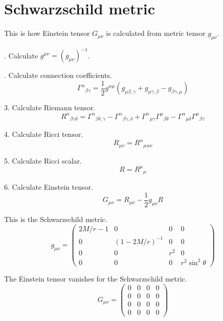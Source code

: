 \documentclass[12pt]{article}
\begin{document}
\section*{Schwarzschild metric}

This is how Einstein tensor $G_{\mu\nu}$ is calculated from metric tensor $g_{\mu\nu}$.

. Calculate $g^{\mu\nu}=(g_{\mu\nu})^{-1}$.

. Calculate connection coefficients.
\begin{equation*}
\Gamma^\alpha{}_{\beta\gamma}=\frac{1}{2}
g^{\alpha\mu}(g_{\mu\beta,\gamma}+g_{\mu\gamma,\beta}-g_{\beta\gamma,\mu})
\end{equation*}

3. Calculate Riemann tensor.
\begin{equation*}
R^\alpha{}_{\beta\gamma\delta}
=\Gamma^\alpha{}_{\beta\delta,\gamma}
-\Gamma^\alpha{}_{\beta\gamma,\delta}
+\Gamma^\alpha{}_{\mu\gamma}\Gamma^\mu{}_{\beta\delta}
-\Gamma^\alpha{}_{\mu\delta}\Gamma^\mu{}_{\beta\gamma}
\end{equation*}

4. Calculate Ricci tensor.
\begin{equation*}
R_{\mu\nu}=R^\alpha{}_{\mu\alpha\nu}
\end{equation*}

5. Calculate Ricci scalar.
\begin{equation*}
R=R^\mu{}_\mu
\end{equation*}

6. Calculate Einstein tensor.
\begin{equation*}
G_{\mu\nu}=R_{\mu\nu}-\frac{1}{2}g_{\mu\nu}R
\end{equation*}

This is the Schwarzschild metric.
\begin{equation*}
g_{\mu\nu}=\begin{pmatrix}
2M/r-1 & 0 & 0 & 0
\\
0 & (1 - 2M/r)^{-1} & 0 & 0
\\
0 & 0 & r^2 & 0
\\
0 & 0 & 0 & r^2\sin^2\theta
\end{pmatrix}
\end{equation*}

The Einstein tensor vanishes for the Schwarzschild metric.
\begin{equation*}
G_{\mu\nu}=\begin{pmatrix}
0 & 0 & 0 & 0
\\
0 & 0 & 0 & 0
\\
0 & 0 & 0 & 0
\\
0 & 0 & 0 & 0
\end{pmatrix}
\end{equation*}
\end{document}
